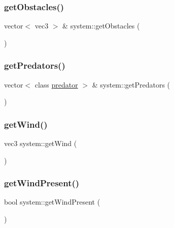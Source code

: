 \mbox{\label{classsystem_a746b09f9814414e9d6b3eca935184707}} 
\subsubsection{\texorpdfstring{get\+Obstacles()}{getObstacles()}}
{\footnotesize\ttfamily vector$<$ vec3 $>$ \& system\+::get\+Obstacles (\begin{DoxyParamCaption}{ }\end{DoxyParamCaption})}

\mbox{\label{classsystem_ae640574f3de3538c33958a3f9d77d5ca}} 
\subsubsection{\texorpdfstring{get\+Predators()}{getPredators()}}
{\footnotesize\ttfamily vector$<$ class \mbox{\hyperlink{classpredator}{predator}} $>$ \& system\+::get\+Predators (\begin{DoxyParamCaption}{ }\end{DoxyParamCaption})}

\mbox{\label{classsystem_ac2e94ef9353084e3b3651189b052f993}} 
\subsubsection{\texorpdfstring{get\+Wind()}{getWind()}}
{\footnotesize\ttfamily vec3 system\+::get\+Wind (\begin{DoxyParamCaption}{ }\end{DoxyParamCaption})}

\mbox{\label{classsystem_a3efdff4ad0a66b21a7b284078584408d}} 
\subsubsection{\texorpdfstring{get\+Wind\+Present()}{getWindPresent()}}
{\footnotesize\ttfamily bool system\+::get\+Wind\+Present (\begin{DoxyParamCaption}{ }\end{DoxyParamCaption})}

